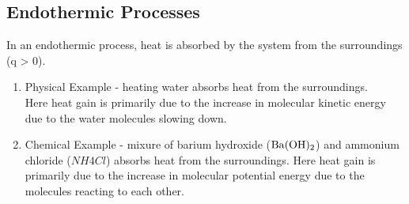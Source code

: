 \documentclass{article}  %
\begin{document}
\subsection*{Endothermic Processes}
In an endothermic process, heat is absorbed by the system from the surroundings (q > 0).
\begin{enumerate}
    \item Physical Example - heating water absorbs heat from the surroundings. \\
    Here heat gain is primarily due to the increase in molecular kinetic energy due to the water molecules slowing down.
    \item Chemical Example - mixure of barium hydroxide ($\ce{Ba(OH)2}$) and ammonium chloride ($NH4Cl$) absorbs heat from the surroundings.
    Here heat gain is primarily due to the increase in molecular potential energy due to the molecules reacting to each other.
\end{enumerate}
\end{document}
